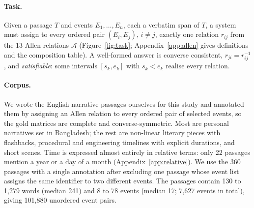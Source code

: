 \documentclass[11pt]{article}
\begin{document}
\paragraph{Task.}
Given a passage $T$ and events $E_1,\dots,E_n$, each a verbatim span of $T$, a system must assign to every ordered pair $(E_i,E_j)$, $i\neq j$, exactly one relation $r_{ij}$ from the 13 Allen relations $\mathcal{A}$ (Figure~\ref{fig:task}; Appendix~\ref{app:allen} gives definitions and the composition table). A well-formed answer is converse consistent, $r_{ji}=r_{ij}^{-1}$, and \emph{satisfiable}: some intervals $[s_k,e_k]$ with $s_k<e_k$ realise every relation.

\paragraph{Corpus.}
We wrote the English narrative passages ourselves for this study and annotated them by assigning an Allen relation to every ordered pair of selected events, so the gold matrices are complete and converse-symmetric. Most are personal narratives set in Bangladesh; the rest are non-linear literary pieces with flashbacks, procedural and engineering timelines with explicit durations, and short scenes. Time is expressed almost entirely in relative terms: only 22 passages mention a year or a day of a month (Appendix~\ref{app:relative}). We use the 360 passages with a single annotation after excluding one passage whose event list assigns the same identifier to two different events. The passages contain 130 to 1,279 words (median 241) and 8 to 78 events (median 17; 7,627 events in total), giving 101,880 unordered event pairs.
\end{document}
